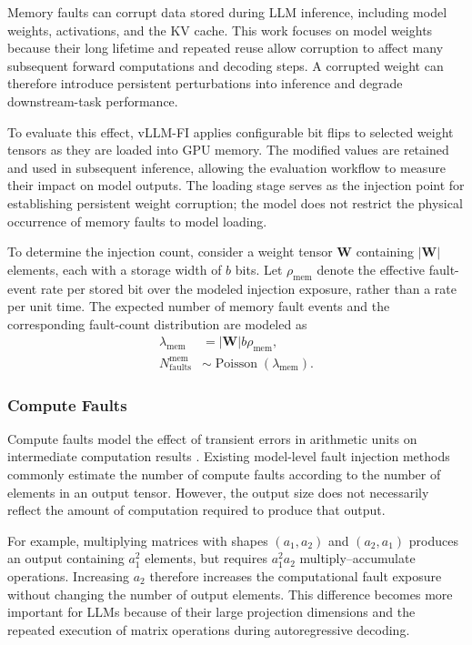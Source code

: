 Memory faults can corrupt data stored during LLM inference, including model weights, activations, and the KV cache. This work focuses on model weights because their long lifetime and repeated reuse allow corruption to affect many subsequent forward computations and decoding steps. A corrupted weight can therefore introduce persistent perturbations into inference and degrade downstream-task performance.

To evaluate this effect, vLLM-FI applies configurable bit flips to selected weight tensors as they are loaded into GPU memory. The modified values are retained and used in subsequent inference, allowing the evaluation workflow to measure their impact on model outputs. The loading stage serves as the injection point for establishing persistent weight corruption; the model does not restrict the physical occurrence of memory faults to model loading.

To determine the injection count, consider a weight tensor $\mathbf{W}$ containing $|\mathbf{W}|$ elements, each with a storage width of $b$ bits. Let $\rho_{\mathrm{mem}}$ denote the effective fault-event rate per stored bit over the modeled injection exposure, rather than a rate per unit time. The expected number of memory fault events and the corresponding fault-count distribution are modeled as
\begin{align}
    \lambda_{\mathrm{mem}}
    &= |\mathbf{W}|b\rho_{\mathrm{mem}},
    \label{eq:memory_exposure}\\
    N_{\mathrm{faults}}^{\mathrm{mem}}
    &\sim \operatorname{Poisson}(\lambda_{\mathrm{mem}}).
    \label{eq:memory_poisson}
\end{align}

\subsubsection{Compute Faults}

Compute faults model the effect of transient errors in arithmetic units on intermediate computation results \cite{ashraf2015understanding}. Existing model-level fault injection methods commonly estimate the number of compute faults according to the number of elements in an output tensor. However, the output size does not necessarily reflect the amount of computation required to produce that output.

For example, multiplying matrices with shapes $(a_1,a_2)$ and $(a_2,a_1)$ produces an output containing $a_1^2$ elements, but requires $a_1^2a_2$ multiply--accumulate operations. Increasing $a_2$ therefore increases the computational fault exposure without changing the number of output elements. This difference becomes more important for LLMs because of their large projection dimensions and the repeated execution of matrix operations during autoregressive decoding.

